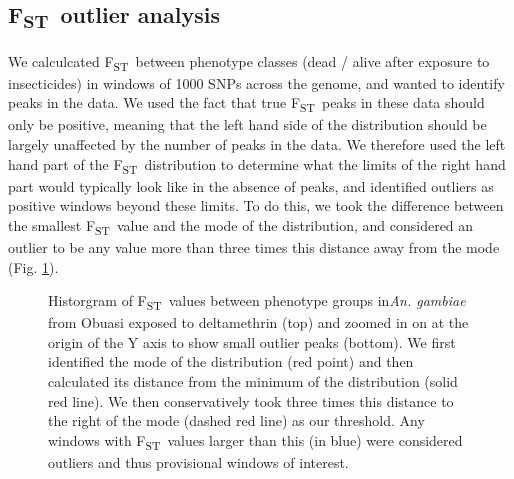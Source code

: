 \documentclass[a4paper,12pt]{article}
\newcommand{\fst}{F\textsubscript{ST}}
\begin{document}
\clearpage

\subsection{\fst\ outlier analysis}

We calculcated \fst\ between phenotype classes (dead / alive after exposure to insecticides) in windows of 1000 SNPs across the genome, and wanted to identify peaks in the data. We used the fact that true \fst\ peaks in these data should only be positive, meaning that the left hand side of the distribution should be largely unaffected by the number of peaks in the data. We therefore used the left hand part of the \fst\ distribution to determine what the limits of the right hand part would typically look like in the absence of peaks, and identified outliers as positive windows beyond these limits. To do this, we took the difference between the smallest \fst\ value and the mode of the distribution, and considered an outlier to be any value more than three times this distance away from the mode (Fig. \ref{FigM3}).


\begin{figure}[h]
	\hspace*{-1cm}
	\begin{minipage}{\textwidth}
		\begin{center}
		\end{center}
	\end{minipage}
	\caption{\footnotesize Historgram of \fst\ values between phenotype groups in\textit{An. gambiae} from Obuasi exposed to deltamethrin (top) and zoomed in on at the origin of the Y axis to show small outlier peaks (bottom). We first identified the mode of the distribution (red point) and then calculated its distance from the minimum of the distribution (solid red line). We then conservatively took three times this distance to the right of the mode (dashed red line) as our threshold. Any windows with \fst\ values larger than this (in blue) were considered outliers and thus provisional windows of interest.}
	\label{FigM3}
\end{figure}
\end{document}
